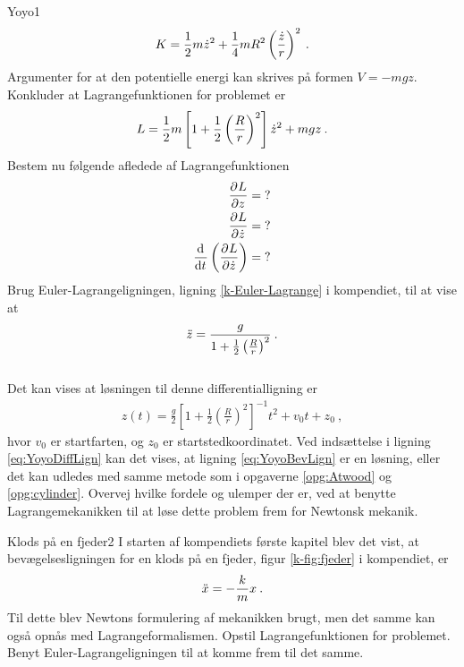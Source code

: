 \begin{opgave}{Yoyo}{1}
\begin{align*}
	K = \frac{1}{2}m\dt{z}^2 + \frac{1}{4}mR^2\left(\frac{\dt{z}}{r}\right)^2 \: .
\end{align*}
\opg Argumenter for at den potentielle energi kan skrives på formen $V = -mgz$.
\opg Konkluder at Lagrangefunktionen for problemet er
\begin{align*}
	L = \frac{1}{2}m\left[1 + \frac{1}{2}\left(\frac{R}{r}\right)^2\right]\dt{z}^2 + mgz \: .
\end{align*}
\opg Bestem nu følgende afledede af Lagrangefunktionen
\begin{align*}
	\pdif{z}{L} &= \; ? \\
	\pdif{\dt{z}}{L} &= \; ? \\
	\el{\dt{z}} &= \; ?
\end{align*}
\opg Brug Euler-Lagrangeligningen, ligning \eqref{k-Euler-Lagrange} i kompendiet, til at vise at
\begin{align} \label{eq:YoyoDiffLign}
	\ddt{z} = \frac{g}{1 + \frac{1}{2}\left(\frac{R}{r}\right)^2} \: .
\end{align} \\[1mm]
Det kan vises at løsningen til denne differentialligning er
\begin{align} \label{eq:YoyoBevLign}
	z(t) = \frac{g}{2}\left[1 + \frac{1}{2}\left(\frac{R}{r}\right)^2\right]^{-1}t^2 + v_0t + z_0 \: ,
\end{align}
hvor $v_0$ er startfarten, og $z_0$ er startstedkoordinatet. Ved indsættelse i ligning \eqref{eq:YoyoDiffLign} kan det vises, at ligning \eqref{eq:YoyoBevLign} er en løsning, eller det kan udledes med samme metode som i opgaverne \ref{opg:Atwood} og \ref{opg:cylinder}.
\opg Overvej hvilke fordele og ulemper der er, ved at benytte Lagrangemekanikken til at løse dette problem frem for Newtonsk mekanik.
\end{opgave}
%
%
\begin{opgave}{Klods på en fjeder}{2}
I starten af kompendiets første kapitel blev det vist, at bevægelsesligningen for en klods på en fjeder, figur \ref{k-fig:fjeder} i kompendiet, er
\begin{align*}
	\ddt{x} = -\frac{k}{m}x \: .
\end{align*}
Til dette blev Newtons formulering af mekanikken brugt, men det samme kan også opnås med Lagrangeformalismen.
\opg Opstil Lagrangefunktionen for problemet.
\opg Benyt Euler-Lagrangeligningen til at komme frem til det samme.
\end{opgave}
%
%
